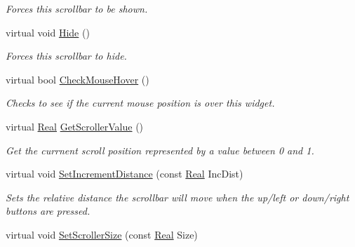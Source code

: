 \begin{DoxyCompactItemize}
\begin{DoxyCompactList}\small\item\em Forces this scrollbar to be shown. \item\end{DoxyCompactList}\item 
\hypertarget{classphys_1_1UI_1_1Scrollbar_aa0aa0d3441ec9c8162025a7e06ec773b}{
virtual void \hyperlink{classphys_1_1UI_1_1Scrollbar_aa0aa0d3441ec9c8162025a7e06ec773b}{Hide} ()}
\label{d0/d3e/classphys_1_1UI_1_1Scrollbar_aa0aa0d3441ec9c8162025a7e06ec773b}

\begin{DoxyCompactList}\small\item\em Forces this scrollbar to hide. \item\end{DoxyCompactList}\item 
virtual bool \hyperlink{classphys_1_1UI_1_1Scrollbar_a8afdd63e36a7fdc15bd8660d9800f2c5}{CheckMouseHover} ()
\begin{DoxyCompactList}\small\item\em Checks to see if the current mouse position is over this widget. \item\end{DoxyCompactList}\item 
virtual \hyperlink{namespacephys_af7eb897198d265b8e868f45240230d5f}{Real} \hyperlink{classphys_1_1UI_1_1Scrollbar_abd70ba640ef9475a77334aa209121812}{GetScrollerValue} ()
\begin{DoxyCompactList}\small\item\em Get the currnent scroll position represented by a value between 0 and 1. \item\end{DoxyCompactList}\item 
virtual void \hyperlink{classphys_1_1UI_1_1Scrollbar_ac2d5081e3d91f0bc02b935b64a5316f9}{SetIncrementDistance} (const \hyperlink{namespacephys_af7eb897198d265b8e868f45240230d5f}{Real} IncDist)
\begin{DoxyCompactList}\small\item\em Sets the relative distance the scrollbar will move when the up/left or down/right buttons are pressed. \item\end{DoxyCompactList}\item 
virtual void \hyperlink{classphys_1_1UI_1_1Scrollbar_a7191e819a7d06e5523ebc9d3f253f60a}{SetScrollerSize} (const \hyperlink{namespacephys_af7eb897198d265b8e868f45240230d5f}{Real} Size)

\end{DoxyCompactItemize}
